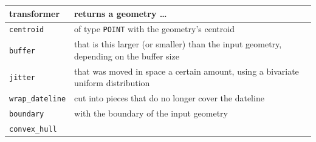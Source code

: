 \documentclass[]{book}
\begin{document}
\begin{longtable}[]{@{}ll@{}}
\toprule
\begin{minipage}[b]{0.23\columnwidth}\raggedright
transformer\strut
\end{minipage} & \begin{minipage}[b]{0.71\columnwidth}\raggedright
returns a geometry \ldots{}\strut
\end{minipage}\tabularnewline
\midrule
\endhead
\begin{minipage}[t]{0.23\columnwidth}\raggedright
\texttt{centroid}\strut
\end{minipage} & \begin{minipage}[t]{0.71\columnwidth}\raggedright
of type \texttt{POINT} with the geometry's centroid\strut
\end{minipage}\tabularnewline
\begin{minipage}[t]{0.23\columnwidth}\raggedright
\texttt{buffer}\strut
\end{minipage} & \begin{minipage}[t]{0.71\columnwidth}\raggedright
that is this larger (or smaller) than the input geometry, depending on the buffer size\strut
\end{minipage}\tabularnewline
\begin{minipage}[t]{0.23\columnwidth}\raggedright
\texttt{jitter}\strut
\end{minipage} & \begin{minipage}[t]{0.71\columnwidth}\raggedright
that was moved in space a certain amount, using a bivariate uniform distribution\strut
\end{minipage}\tabularnewline
\begin{minipage}[t]{0.23\columnwidth}\raggedright
\texttt{wrap\_dateline}\strut
\end{minipage} & \begin{minipage}[t]{0.71\columnwidth}\raggedright
cut into pieces that do no longer cover the dateline\strut
\end{minipage}\tabularnewline
\begin{minipage}[t]{0.23\columnwidth}\raggedright
\texttt{boundary}\strut
\end{minipage} & \begin{minipage}[t]{0.71\columnwidth}\raggedright
with the boundary of the input geometry\strut
\end{minipage}\tabularnewline
\begin{minipage}[t]{0.23\columnwidth}\raggedright
\texttt{convex\_hull}\strut
\end{minipage} & \begin{minipage}[t]{0.71\columnwidth}\raggedright

\end{minipage}
\end{longtable}
\end{document}
